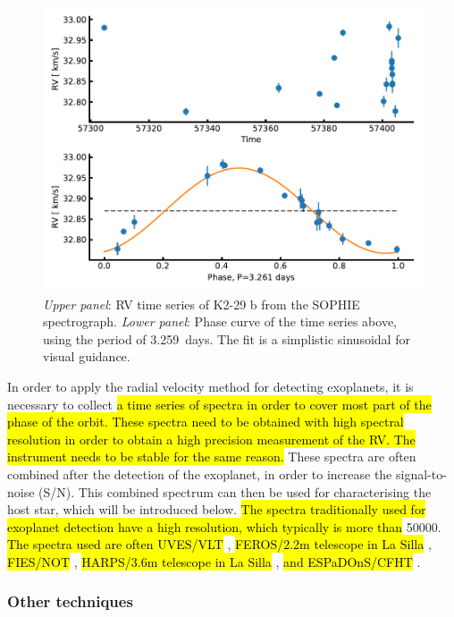 \begin{figure}[htpb!]
    \centering
    \includegraphics[width=1.0\linewidth]{figures/RVmethod.pdf}
    \caption{\emph{Upper panel}: RV time series of K2-29 b from the SOPHIE spectrograph.
             \emph{Lower panel}: Phase curve of the time series above, using the period of
             \SI{3.259}{days}. The fit is a simplistic sinusoidal for visual guidance.}
    \label{fig:rvmethod}
\end{figure}

In order to apply the radial velocity method for detecting exoplanets, it is necessary to collect
\hl{a time series of spectra in order to cover most part of the phase of the orbit. These spectra
need to be obtained with high spectral resolution in order to obtain a high precision measurement of
the RV. The instrument needs to be stable for the same reason.} These spectra are often combined
after the detection of the exoplanet, in order to increase the signal-to-noise (S/N). This combined
spectrum can then be used for characterising the host star, which will be introduced below. \hl{The
spectra traditionally used for exoplanet detection have a high resolution, which typically is more
than} \num{50000}. \hl{The spectra used are often UVES/VLT} \citep{UVES}, \hl{FEROS/2.2m telescope
in La Silla} \citep{FEROS}, \hl{FIES/NOT} \citep{FIES}, \hl{HARPS/3.6m telescope in La Silla}
\citep{HARPS}, \hl{and ESPaDOnS/CFHT} \citep{ESPADONS}.


\subsubsection{Other techniques}

